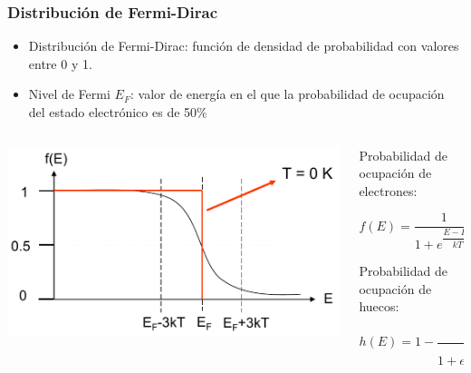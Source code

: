 \documentclass[10pt,t,aspectratio=169]{beamer}
\begin{document}
\begin{frame}[t]
    \frametitle{Distribución de Fermi-Dirac}

    \begin{itemize}
        \item Distribución de Fermi-Dirac: función de densidad de probabilidad con valores entre 0 y 1.
        \item Nivel de Fermi $E_F$: valor de energía en el que la probabilidad de ocupación del estado electrónico es de 50\%
    \end{itemize}

    \begin{columns}
    
        \begin{column}{0.5\textwidth}
        
            \centering
            \includegraphics[width=\textwidth]{./figures/fermi-dirac.pdf}
            
        \end{column}
        
        \begin{column}{0.5\textwidth}
        
            Probabilidad de ocupación de electrones:

            \[ f(E) = \dfrac{1}{1 + e^{\dfrac{E-E_F}{kT}}} \]
        
            \vspace{3mm}
            Probabilidad de ocupación de huecos:
        
            \[ h(E) = 1 - \dfrac{1}{1 + e^{\dfrac{E-E_F}{kT}}} \]
            
        \end{column}
        
    \end{columns}
    
\end{frame}
\end{document}
